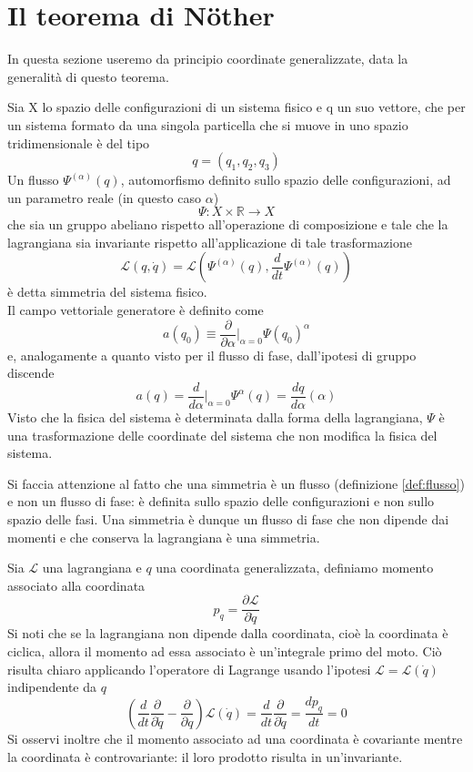 \documentclass[
10pt, %
a4paper, %
oneside, %
headinclude,footinclude, %
BCOR5mm, %
]{scrartcl}
\begin{document}
\newpage
\section{Il teorema di N\"{o}ther}
In questa sezione useremo da principio coordinate generalizzate, data la generalità di questo teorema.
\begin{definizione}
	Sia X lo spazio delle configurazioni di un sistema fisico e q un suo vettore, che per un sistema formato da una singola particella che si muove in uno spazio tridimensionale è del tipo
	\[q = (q_1,q_2,q_3)\]
	Un flusso $\Psi^{(\alpha)}(q)$, automorfismo definito sullo spazio delle configurazioni, ad un parametro reale (in questo caso \(\alpha\))
	\[\Psi:X\times\mathbb{R}\rightarrow X\]
	che sia un gruppo abeliano rispetto all'operazione di composizione e tale che la lagrangiana sia invariante rispetto all'applicazione di tale trasformazione
	\[\mathcal{L}(q, \dot{q}) = \mathcal{L}(\Psi^{(\alpha)}(q), \frac{d}{dt}\Psi^{(\alpha)}(q))\]
	è detta simmetria del sistema fisico.\\
	Il campo vettoriale generatore è definito come
	\[a(q_0)\equiv \frac{\partial}{\partial \alpha}|_{\alpha = 0}\Psi(q_0)^\alpha\]
	e, analogamente a quanto visto per il flusso di fase, dall'ipotesi di gruppo discende
	\[a(q) = \frac{d}{d\alpha}|_{\alpha = 0}\Psi^\alpha(q)=\frac{dq}{d\alpha}(\alpha)\]
	Visto che la fisica del sistema è determinata dalla forma della lagrangiana, $\Psi$ è una trasformazione delle coordinate del sistema che non modifica la fisica del sistema.
\end{definizione}
\begin{osservazione}
	Si faccia attenzione al fatto che una simmetria è un flusso (definizione \ref{def:flusso}) e non un flusso di fase: è definita sullo spazio delle configurazioni e non sullo spazio delle fasi. Una simmetria è dunque un flusso di fase che non dipende dai momenti e che conserva la lagrangiana è una simmetria. 
\end{osservazione}
\begin{definizione}
	Sia $\mathcal{L}$ una lagrangiana e \(q\) una coordinata generalizzata, definiamo momento associato alla coordinata \[p_q = \frac{\partial \mathcal{L}}{\partial \dot{q}}\]
	Si noti che se la lagrangiana non dipende dalla coordinata, cioè la coordinata è ciclica, allora il momento ad essa associato è un'integrale primo del moto. Ciò risulta chiaro applicando l'operatore di Lagrange usando l'ipotesi $\mathcal{L}=\mathcal{L}(\dot{q})$ indipendente da \(q\)
	\[\left(\frac{d}{dt}\frac{\partial}{\partial \dot{q}}-\frac{\partial}{\partial q}\right)\mathcal{L}(\dot{q}) = \frac{d}{dt}\frac{\partial}{\partial \dot{q}} = \frac{dp_q}{dt} = 0\] 
	 Si osservi inoltre che il momento associato ad una coordinata è covariante mentre la coordinata è controvariante: il loro prodotto risulta in un'invariante.
\end{definizione}
\end{document}
